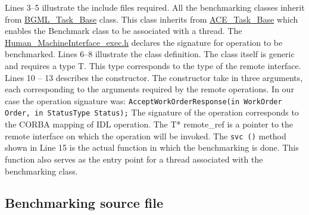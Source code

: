 \documentclass[onecolumn]{article}
\begin{document}
Lines 3--5 illustrate the include files required. All the benchmarking
classes inherit from \url{BGML_Task_Base} class. This class inherits
from \url{ACE_Task_Base} which enables the Benchmark class to be
associated with a thread. The \url{Human_MachineInterface_exec.h}
declares the signature for operation to be benchmarked. Lines 6--8
illustrate the class definition. The class itself is generic and requires
a type T. This type corresponds to the type of the remote interface.
Lines 10 -- 13 describes the constructor. The constructor take in three
arguments, each corresponding to the arguments required by the remote
operations. In our case the operation signature was:
{\tt AcceptWorkOrderResponse(in WorkOrder Order, in StatusType Status);}
The signature of the operation corresponds to the CORBA mapping of IDL
operation. The T* remote\_ref is a pointer to the remote interface on which
the operation will be invoked. The {\tt svc ()} method shown in Line 15
is the actual function in which the benchmarking is done. This function
also serves as the entry point for a thread associated with the benchmarking
class.

\subsection* {Benchmarking source file}
\end{document}
